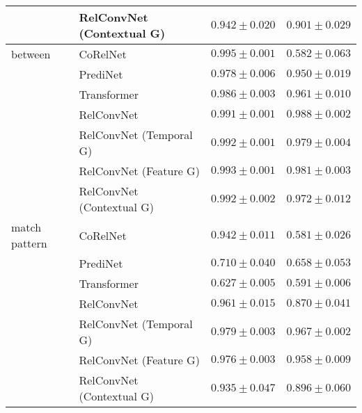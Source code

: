 \begin{tabular}{llll}
              & RelConvNet (Contextual G) &  $0.942 \pm 0.020$ &  $0.901 \pm 0.029$ \\\hline
between & CoRelNet &  $0.995 \pm 0.001$ &  $0.582 \pm 0.063$ \\
              & PrediNet &  $0.978 \pm 0.006$ &  $0.950 \pm 0.019$ \\
              & Transformer &  $0.986 \pm 0.003$ &  $0.961 \pm 0.010$ \\
              & RelConvNet &  $0.991 \pm 0.001$ &  $0.988 \pm 0.002$ \\
              & RelConvNet (Temporal G) &  $0.992 \pm 0.001$ &  $0.979 \pm 0.004$ \\
              & RelConvNet (Feature G) &  $0.993 \pm 0.001$ &  $0.981 \pm 0.003$ \\
              & RelConvNet (Contextual G) &  $0.992 \pm 0.002$ &  $0.972 \pm 0.012$ \\\hline
match pattern & CoRelNet &  $0.942 \pm 0.011$ &  $0.581 \pm 0.026$ \\
              & PrediNet &  $0.710 \pm 0.040$ &  $0.658 \pm 0.053$ \\
              & Transformer &  $0.627 \pm 0.005$ &  $0.591 \pm 0.006$ \\
              & RelConvNet &  $0.961 \pm 0.015$ &  $0.870 \pm 0.041$ \\
              & RelConvNet (Temporal G) &  $0.979 \pm 0.003$ &  $0.967 \pm 0.002$ \\
              & RelConvNet (Feature G) &  $0.976 \pm 0.003$ &  $0.958 \pm 0.009$ \\
              & RelConvNet (Contextual G) &  $0.935 \pm 0.047$ &  $0.896 \pm 0.060$ \\
\bottomrule
\end{tabular}
